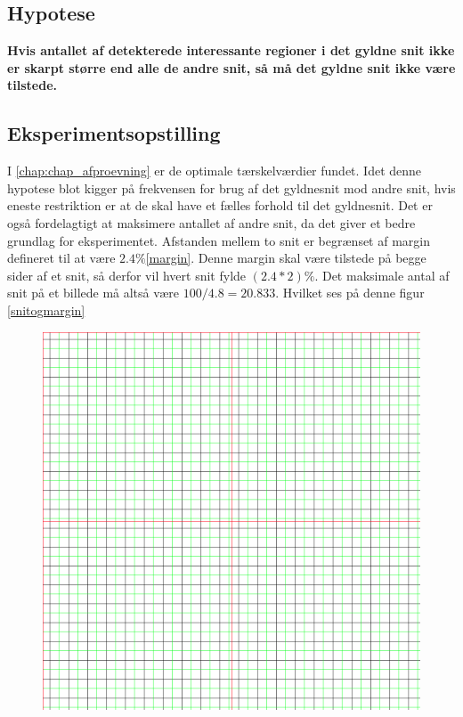 {
\subsection{Hypotese}
{\bf Hvis antallet af detekterede interessante regioner i det gyldne snit
ikke er skarpt større end alle de andre snit, så må det gyldne snit ikke
være tilstede.}
\subsection{Eksperimentsopstilling}
I \ref{chap:chap_afproevning} er de optimale tærskelværdier fundet.
Idet denne hypotese blot kigger på frekvensen for brug af det gyldnesnit
mod andre snit, hvis eneste restriktion er at de skal have et fælles
forhold til det gyldnesnit.
Det er også fordelagtigt at maksimere antallet af andre snit, da det
giver et bedre grundlag for eksperimentet.
Afstanden mellem to snit er begrænset af margin defineret til at være
$2.4\%$\ref{margin}. 
Denne margin skal være tilstede på begge sider af et snit, så derfor vil
hvert snit fylde $(2.4*2)\%$.
Det maksimale antal af snit på et billede må altså være
$100/4.8=20.833$. Hvilket ses på denne figur \ref{snitogmargin}
\begin{figure}[h!]
	\begin{center}
		\includegraphics[scale=0.3]{afsnit/resultater/billeder/20_cuts_med_margin}

\end{center}
\end{figure}}

